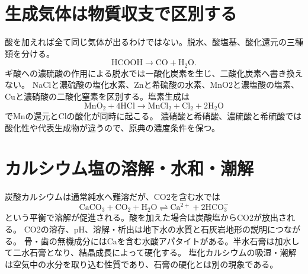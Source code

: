 \section{生成気体は物質収支で区別する}\label{theory:inorganic:gas_generation}
酸を加えれば全て同じ気体が出るわけではない。脱水、酸塩基、酸化還元の三種類を分ける。
\[
 \mathrm{HCOOH}\longrightarrow\mathrm{CO}+\mathrm{H_2O}.
\]
ギ酸への濃硫酸の作用による脱水では一酸化炭素を生じ、二酸化炭素へ書き換えない\cite{analysis49_co_ref}。
NaClと濃硫酸の塩化水素、Znと希硫酸の水素、MnO2と濃塩酸の塩素、Cuと濃硝酸の二酸化窒素を区別する。塩素生成は
\[
 \mathrm{MnO_2}+4\mathrm{HCl}\longrightarrow
 \mathrm{MnCl_2}+\mathrm{Cl_2}+2\mathrm{H_2O}
\]
でMnの還元とClの酸化が同時に起こる\cite{inorganic_halogen_ref}。
濃硝酸と希硝酸、濃硫酸と希硫酸では酸化性や代表生成物が違うので、原典の濃度条件を保つ。

\section{カルシウム塩の溶解・水和・潮解}\label{theory:inorganic:calcium}
炭酸カルシウムは通常純水へ難溶だが、CO2を含む水では
\[
 \mathrm{CaCO_3}+\mathrm{CO_2}+\mathrm{H_2O}
 \rightleftharpoons\mathrm{Ca^{2+}}+2\mathrm{HCO_3^-}
\]
という平衡で溶解が促進される。酸を加えた場合は炭酸塩からCO2が放出される。
CO2の溶存、pH、溶解・析出は地下水の水質と石灰岩地形の説明につながる\cite{inorganic_waterchem}。
骨・歯の無機成分にはCaを含む水酸アパタイトがある。半水石膏は加水して二水石膏となり、結晶成長によって硬化する\cite{analysis49_gypsum_ref}。
塩化カルシウムの吸湿・潮解は空気中の水分を取り込む性質であり、石膏の硬化とは別の現象である。

